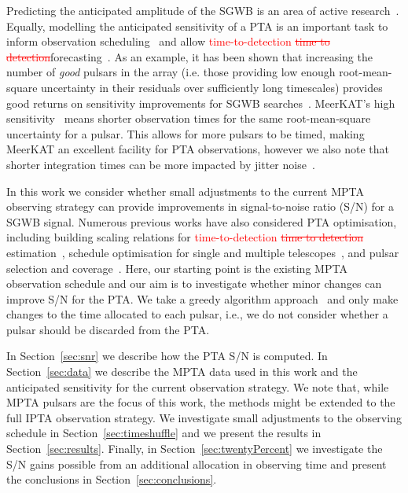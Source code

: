 \documentclass[fleqn,usenatbib]{mnras}
\newcommand{\change}{\textcolor{red}}
\begin{document}
Predicting the anticipated amplitude of the SGWB is an area of active research~\citep[see, for example][]{JaffeBacker:2003, Sesana:2013, KelleyEtAl:2017, SykesEtAl:2022}.
Equally, modelling the anticipated sensitivity of a PTA is an important task to inform observation scheduling~\citep{ChristyEtAl:2014,Lam:2018} and allow \change{time-to-detection \st{time to detection}}forecasting~\citep{TaylorEtAl:2016,VigelandSiemens:2016,KelleyEtAl:2017, PolEtAl:2021,BecsyEtAl:2022}.
As an example, it has been shown that increasing the number of \emph{good} pulsars in the array (i.e. those providing low enough root-mean-square uncertainty in their residuals over sufficiently long timescales) provides good returns on sensitivity improvements for SGWB searches~\citep[e.g.][]{SiemensEtAl:2013}.
MeerKAT's high sensitivity~\citep{MeerTimeBailesEtAl:2020} means shorter observation times for the same root-mean-square uncertainty for a pulsar. 
This allows for more pulsars to be timed, making MeerKAT an excellent facility for PTA observations, however we also note that shorter integration times can be more impacted by jitter noise~\cite[see, e.g.][]{CordesShannon:2010, CordesDowns:1985, ParthasarathyEtAl:2021}.

In this work we consider whether small adjustments to the current MPTA observing strategy can provide improvements in signal-to-noise ratio (S/N) for a SGWB signal. 
Numerous previous works have also considered PTA optimisation, including building scaling relations for \change{time-to-detection \st{time to detection}} estimation~\citep{SiemensEtAl:2013}, schedule optimisation for single and multiple telescopes~\citep{LeeEtAl:2012, ChristyEtAl:2014, Lam:2018, LamEtAl:2018}, and pulsar selection and coverage~\citep{SperiEtAl:2023, Roebber:2019}.   
Here, our starting point is the existing MPTA observation schedule and our aim is to investigate whether minor changes can improve S/N for the PTA. 
We take a greedy algorithm approach~\citep[e.g.][]{DechterDechter:1998} and only make changes to the time allocated to each pulsar, i.e., we do not consider whether a pulsar should be discarded from the PTA. 

In Section~\ref{sec:snr} we describe how the PTA S/N is computed.
In Section~\ref{sec:data} we describe the MPTA data used in this work and the anticipated sensitivity for the current observation strategy. 
We note that, while MPTA pulsars are the focus of this work, the methods might be extended to the full IPTA observation strategy. 
We investigate small adjustments to the observing schedule in Section~\ref{sec:timeshuffle} and we present the results in Section~\ref{sec:results}.
Finally, in Section~\ref{sec:twentyPercent} we investigate the S/N gains possible from an additional allocation in observing time and present the conclusions in Section~\ref{sec:conclusions}.
\end{document}
